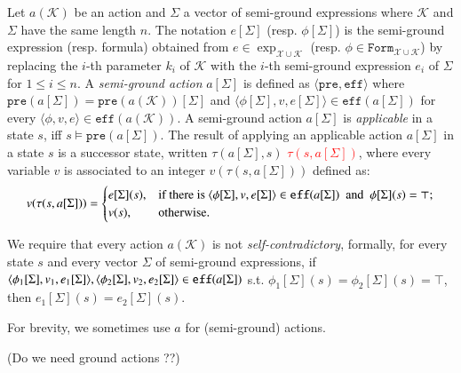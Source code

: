 \documentclass[review]{elsarticle}
\newcommand{\formula}{\mathtt{Form}}
\newcommand{\tuple}[1]{\langle {#1} \rangle}
\newcommand{\true}{\top}
\newcommand{\statevar}{\mathcal{X}}
\newcommand{\actparm}{\mathcal{K}}
\newcommand{\parmset}{\mathcal{K}}
\newcommand{\expVec}{\Sigma}
\newcommand{\pre}{\mathtt{pre}}
\newcommand{\eff}{\mathtt{eff}}
\newcommand{\con}{\phi}
\newcommand{\suc}{\tau}
\begin{document}
	
	Let $a(\parmset)$ be an action and $\expVec$ a vector of semi-ground expressions where $\parmset$ and $\expVec$ have the same length $n$.
	The notation $e[\expVec]$ (resp. $\phi[\expVec]$) is the semi-ground expression (resp. formula) obtained from $e \in \exp_{\statevar \cup \parmset}$ (resp. $\phi \in \formula_{\statevar \cup \parmset}$) by replacing the $i$-th parameter $k_i$ of $\actparm$ with the $i$-th semi-ground expression $e_i$ of $\expVec$ for $1 \leq i \leq n$. 
	A \textit{semi-ground action} $a[\expVec]$ is defined as $\tuple{\pre, \eff}$ where $\pre(a[\expVec]) = \pre(a(\parmset))[\expVec]$ and $\tuple{\con[\expVec], v, e[\expVec]} \in \eff(a[\expVec])$ for every $\tuple{\con, v, e} \in \eff(a(\parmset))$.
	A semi-ground action $a[\expVec]$ is \textit{applicable} in a state $s$, iff $s \models \pre(a[\expVec])$.
	The result of applying an applicable action $a[\expVec]$ in a state $s$ is a successor state, written $\suc(a[\expVec], s)$ \textcolor{red}{$\suc( s, a[\expVec])$}, where every variable $v$ is associated to an integer $v(\suc(s, a[\expVec]))$ defined as:	
	\[v(\suc(s, a[\expVec])) =
	\begin{cases}
		e[\expVec](s), & \text{if there is } \tuple{\con[\expVec], v, e[\expVec]} \in \eff(a[\expVec])$ \text{ and } $\con[\expVec](s) = \true; \\
		v(s), & \text{otherwise. } 
	\end{cases}\]
	
	We require that every action $a(\parmset)$ is not \textit{self-contradictory}, formally, for every state $s$ and every vector $\expVec$ of semi-ground expressions, if $\tuple{\con_1[\expVec], v_1, e_1[\expVec]}, \\ \tuple{\con_2[\expVec], v_2, e_2[\expVec]} \in \eff(a[\expVec])$ s.t. $\con_1[\expVec](s) = \con_2[\expVec](s) = \true$, then $e_1[\expVec](s) = e_2[\expVec](s)$.
	
	For brevity, we sometimes use $a$ for (semi-ground) actions.
	
	(Do we need ground actions ??)
\end{document}
